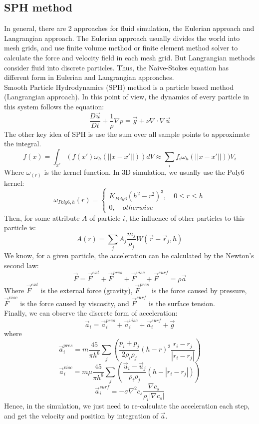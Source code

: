 \documentclass[acmtog]{acmart}
\begin{document}
\subsection{SPH method}
In general, there are 2 approaches for fluid simulation, the Eulerian approach and Langrangian approach. The Eulerian 
approach usually divides the world into mesh grids, and use finite volume method or finite element method solver to 
calculate the force and velocity field in each mesh grid. But Langrangian methods consider fluid into discrete particles. 
Thus, the Naive-Stokes equation has different form in Eulerian and Langrangian approaches.\\
Smooth Particle Hydrodynamics (SPH) method is a particle based method (Langrangian approach). In this point of view, 
the dynamics of every particle in this system follows the equation:
$$\frac{D{\vec{u}}}{D{t}} + \frac{1}{\rho}\nabla p = \vec{g} + \nu \nabla \cdot \nabla \vec{u}$$
The other key idea of SPH is use the sum over all sample points to approximate the integral. 
$$f(x) = \int _{x'}(f(x')\omega _h(||x - x'||))dV \approx \sum_{i}f_i\omega_h(||x - x'||))V_i$$
Where $\omega_(r)$ is the kernel function. In 3D simulation, we usually use the Poly6 kernel:
$$\omega_{Poly6, h}(r) = \begin{cases}
    K_{Poly6}(h^2 - r^2)^3, \quad 0\le r \le h\\
    0, \quad otherwise \end{cases}
$$
Then, for some attribute $A$ of particle $i$, the influence of other particles to this particle is:
$$A(r) = \sum_{j}{A_j \frac{m_j}{\rho_j} W(\vec{r} - \vec{r}_j, h)}$$
We know, for a given particle, the acceleration can be calculated by the Newton's second law:
$$\vec{F} = \vec{F}^{ext} + \vec{F}^{pres} + \vec{F}^{visc} + \vec{F}^{surf} = \rho \vec{a}$$
Where $\vec{F}^{ext}$ is the external force (gravity), $\vec{F}^{pres}$ is the force caused by 
pressure, $\vec{F}^{visc}$ is the force caused by viscosity, and $\vec{F}^{surf}$ is the surface 
tension.\\
Finally, we can observe the discrete form of acceleration:
$$\vec{a}_i = \vec{a}_i^{pres} + \vec{a}_i^{visc} + \vec{a}_i^{surf} + \vec{g}$$
where
$$\vec{a}_i ^{pres} = m\frac{45}{\pi h^6}\sum_{j}(\frac{p_i + p_j}{2\rho _i \rho _j}(h-r)^2\frac{r_i - r_j}{|r_i - r_j|})$$
$$\vec{a}_i ^{visc} = m\mu\frac{45}{\pi h^6}\sum_{j}(\frac{\vec{u}_i - \vec{u}_j}{\rho_i \rho_j}(h - |r_i - r_j|))$$
$$\vec{a}_i ^{surf} = -\sigma\nabla ^2c_s \frac{\nabla c_s}{\rho_i |\nabla c_s|}$$
Hence, in the simulation, we just need to re-calculate the acceleration each step, and get the velocity and 
position by integration of $\vec{a}$. 
\end{document}
